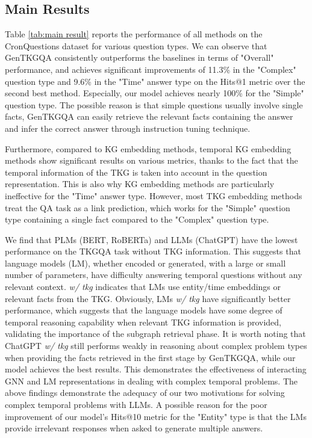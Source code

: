 \documentclass[11pt]{article}
\begin{document}
\subsection{Main Results} \label{sec:mainresult}

Table \ref{tab:main result} reports the performance of all methods on the CronQuestions dataset for various question types. 
We can observe that GenTKGQA consistently outperforms the baselines in terms of "Overall" performance, and achieves significant improvements of 11.3\% in the "Complex" question type and 9.6\% in the "Time" answer type on the Hits@1 metric over the second best method.
Especially, our model achieves nearly 100\% for the "Simple" question type.
The possible reason is that simple questions usually involve single facts, GenTKGQA can easily retrieve the relevant facts containing the answer and infer the correct answer through instruction tuning technique.

Furthermore, compared to KG embedding methods, temporal KG embedding methods show significant results on various metrics, thanks to the fact that the temporal information of the TKG is taken into account in the question representation. 
This is also why KG embedding methods are particularly ineffective for the "Time" answer type.
However, most TKG embedding methods treat the QA task as a link prediction, which works for the "Simple" question type containing a single fact compared to the "Complex" question type.

We find that PLMs (BERT, RoBERTa) and LLMs (ChatGPT) have the lowest performance on the TKGQA task without TKG information. This suggests that language models (LM), whether encoded or generated, with a large or small number of parameters, have difficulty answering temporal questions without any relevant context. 
\textit{w/ tkg} indicates that LMs use entity/time embeddings or relevant facts from the TKG. 
Obviously, LMs \textit{w/ tkg} have significantly better performance, which suggests that the language models have some degree of temporal reasoning capability when relevant TKG information is provided, validating the importance of the subgraph retrieval phase. 
It is worth noting that ChatGPT \textit{w/ tkg} still performs weakly in reasoning about complex problem types when providing the facts retrieved in the first stage by GenTKGQA, while our model achieves the best results.
This demonstrates the effectiveness of interacting GNN and LM representations in dealing with complex temporal problems.
The above findings demonstrate the adequacy of our two motivations for solving complex temporal problems with LLMs.
A possible reason for the poor improvement of our model's Hits@10 metric for the "Entity" type is that the LMs provide irrelevant responses when asked to generate multiple answers.
\end{document}
